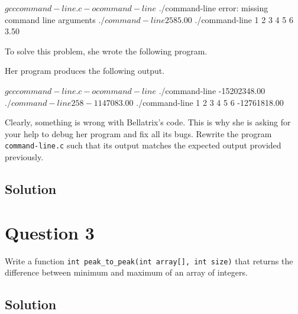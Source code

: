 \documentclass[12pt,letterpaper,twoside]{article}
\begin{document}
\begin{terminal}
$ gcc command-line.c -o command-line
$ ./command-line
error: missing command line arguments
$ ./command-line 2 5 8
5.00
$ ./command-line 1 2 3 4 5 6
3.50
\end{terminal}

To solve this problem, she wrote the following program.

\lstset{language=c,tabsize=4}


\newpage

Her program produces the following output.

\begin{terminal}
$ gcc command-line.c -o command-line
$ ./command-line
-15202348.00
$ ./command-line 2 5 8
-1147083.00
$ ./command-line 1 2 3 4 5 6
-12761818.00
\end{terminal}

Clearly, something is wrong with Bellatrix's code.
This is why she is asking for your help to debug her program and fix all its bugs.
Rewrite the program \texttt{command-line.c} such that its output matches the expected output provided previously.

\subsection*{Solution}

\lstset{language=c,tabsize=4}


\newpage

\section*{Question 3}

Write a function \texttt{int peak\_to\_peak(int array[], int size)} that returns the difference between minimum and maximum of an array of integers.

\subsection*{Solution}

\lstset{language=c,tabsize=4}

\end{document}

